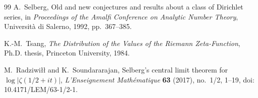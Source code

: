 \documentclass[12pt]{article}
\numberwithin{equation}{section}
\begin{document}
\begin{thebibliography}{99}
A.~Selberg,
Old and new conjectures and results about a class of Dirichlet series,
in \emph{Proceedings of the Amalfi Conference on Analytic Number Theory},
Universit\`a di Salerno, 1992, pp.~367--385.

K.-M.~Tsang,
\emph{The Distribution of the Values of the Riemann Zeta-Function},
Ph.D. thesis, Princeton University, 1984.

M.~Radziwi\l\l{} and K.~Soundararajan,
Selberg's central limit theorem for \(\log |\zeta(1/2+it)|\),
\emph{L'Enseignement Math\'ematique} \textbf{63} (2017), no.~1/2, 1--19,
doi: 10.4171/LEM/63-1/2-1.

\end{thebibliography}
\end{document}
